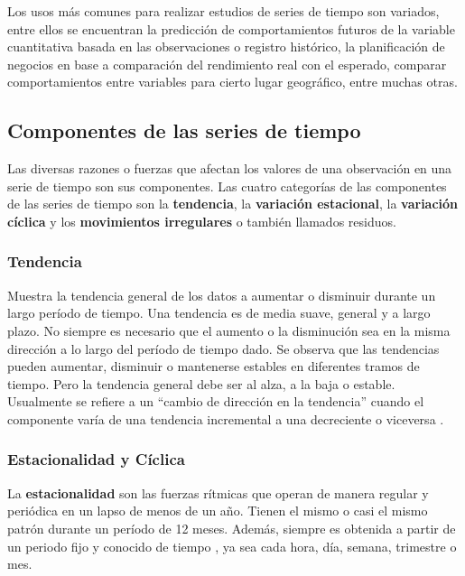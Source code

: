 Los usos más comunes para realizar estudios de series de tiempo son variados, entre ellos se encuentran la predicción de comportamientos
futuros de la variable cuantitativa basada en las observaciones o registro histórico, la planificación de negocios en base a comparación del 
rendimiento real con el esperado, comparar comportamientos entre variables para cierto lugar geográfico, entre muchas otras. 


    \subsection{Componentes de las series de tiempo}
    
    Las diversas razones o fuerzas que afectan los valores de una observación en una serie de tiempo son sus componentes. 
    Las cuatro categorías de las componentes de las series de tiempo son la \textbf{tendencia}, la \textbf{variación estacional}, la \textbf{variación cíclica} 
    y los \textbf{movimientos irregulares} o también llamados residuos.

    \subsubsection{Tendencia}
    Muestra la tendencia general de los datos a aumentar o disminuir durante un largo período de tiempo. Una tendencia es de media suave, general y 
    a largo plazo. No siempre es necesario que el aumento o la disminución sea en la misma dirección a lo largo del período de tiempo dado.
    Se observa que las tendencias pueden aumentar, disminuir o mantenerse estables en diferentes tramos de tiempo. Pero la tendencia general debe ser al alza, a la baja o estable. 
    Usualmente se refiere a un ``cambio de dirección en la tendencia'' cuando el componente varía de una tendencia incremental a una decreciente o viceversa \cite{20}.

    \subsubsection{Estacionalidad y Cíclica}
    
    La \textbf{estacionalidad} son las fuerzas rítmicas que operan de manera regular y periódica en un lapso de menos de un año. Tienen el mismo o casi el mismo patrón durante un período de 12 meses. 
    Además, siempre es obtenida a partir de un periodo fijo y conocido de tiempo \cite{20}, ya sea cada hora, día, semana, trimestre o mes.
    
